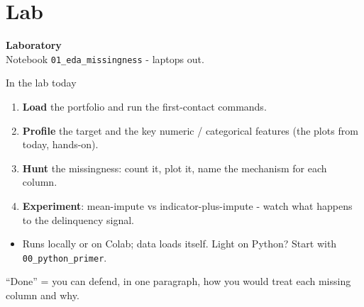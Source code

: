 \documentclass[10pt,aspectratio=169]{beamer}
\begin{document}
\section{Lab}

\begin{frame}[plain]
  \begin{center}
    \vspace{1.5cm}
    {\LARGE\textbf{Laboratory}}\\[0.6cm]
    {\normalsize Notebook \texttt{01\_eda\_missingness} - laptops out.}
  \end{center}
\end{frame}

\begin{frame}{In the lab today}
  \begin{enumerate}
    \item \textbf{Load} the portfolio and run the first-contact commands.
    \item \textbf{Profile} the target and the key numeric / categorical
          features (the plots from today, hands-on).
    \item \textbf{Hunt} the missingness: count it, plot it, name the
          mechanism for each column.
    \item \textbf{Experiment}: mean-impute vs indicator-plus-impute - watch
          what happens to the delinquency signal.
  \end{enumerate}
  \vspace{0.3em}
  \begin{itemize}\small
    \item Runs locally or on Colab; data loads itself. Light on Python?
          Start with \texttt{00\_python\_primer}.
  \end{itemize}
  \vspace{0.3em}
  \begin{center}\small
    ``Done'' = you can defend, in one paragraph, how you would treat each
    missing column and why.
  \end{center}
\end{frame}

\end{document}
